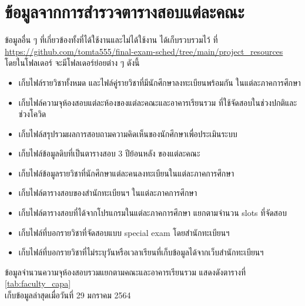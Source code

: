 \section{ข้อมูลจากการสำรวจตารางสอบแต่ละคณะ}
ข้อมูลอื่น ๆ ที่เกี่ยวข้องทั้งที่ได้ใช้งานและไม่ได้ใช้งาน ได้เก็บรวบรวมไว้ ที่ \url{https://github.com/tomta555/final-exam-sched/tree/main/project_resources}
\\ โดยในโฟลเดอร์  จะมีโฟลเดอร์ย่อยต่าง ๆ ดังนี้ 
\begin{itemize}
  \item {} เก็บไฟล์รายวิชาทั้งหมด และไฟล์คู่รายวิชาที่มีนักศึกษาลงทะเบียนพร้อมกัน ในแต่ละภาคการศึกษา
  \item {} เก็บไฟล์ความจุห้องสอบแต่ละห้องของแต่ละคณะและอาคารเรียนรวม ที่ใช้จัดสอบในช่วงปกติและช่วงโควิด
  \item {} เก็บไฟล์สรุปรวมผลการสอบถามความคิดเห็นของนักศึกษาเพื่อประเมินระบบ
  \item {} เก็บไฟล์ข้อมูลดิบที่เป็นตารางสอบ 3 ปีย้อนหลัง ของแต่ละคณะ
  \item {} เก็บไฟล์ข้อมูลรายวิชาที่นักศึกษาแต่ละคนลงทะเบียนในแต่ละภาคการศึกษา
  \item {} เก็บไฟล์ตารางสอบของสำนักทะเบียนฯ ในแต่ละภาคการศึกษา
  \item {} เก็บไฟล์ตารางสอบที่ได้จากโปรแกรมในแต่ละภาคการศึกษา แยกตามจำนวน slots ที่จัดสอบ
  \item {} เก็บไฟล์ที่บอกรายวิชาที่จัดสอบแบบ special exam โดยสำนักทะเบียนฯ
  \item {} เก็บไฟล์ที่บอกรายวิชาที่ไม่ระบุวันหรือเวลาเรียนที่เก็บข้อมูลได้จากเว็บสำนักทะเบียนฯ
\end{itemize}

\noindent ข้อมูลจำนวนความจุห้องสอบรวมแยกตามคณะและอาคารเรียนรวม แสดงดังตารางที่ \ref{tab:faculty_capa} \\ เก็บข้อมูลล่าสุดเมื่อวันที่ 29 มกราคม 2564

